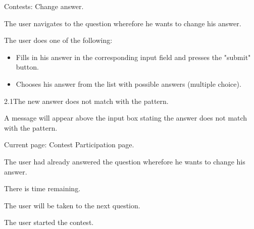 \begin{uc}{Contests: Change answer.}

    \begin{uc-mss}
    \item The user navigates to the question wherefore he wants to change his answer. 
     \item The user does one of the following:
        \begin{itemize}
            \item Fills in his answer in the corresponding input field and presses the "submit" button.
            \item Chooses his answer from the list with possible answers (multiple choice).
        \end{itemize}
    \end{uc-mss}

    \begin{uc-ext}

        \begin{uc-fail}{2.1}{The new answer does not match with the pattern.}
        \item A message will appear above the input box stating the answer does not match with the pattern.
        \end{uc-fail}

    \end{uc-ext}

    \begin{uc-pre}
    \item Current page: Contest Participation page.
    \item The user had already answered the question wherefore he wants to change his answer.
    \item There is time remaining.
    \end{uc-pre}

    \begin{uc-post}
    \item The user will be taken to the next question.
    \end{uc-post}

    \begin{uc-trig}
    The user started the contest.
    \end{uc-trig}

\end{uc}

